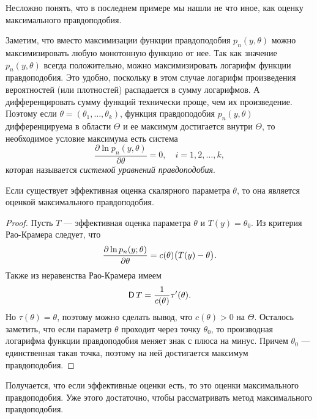 Несложно понять, что в последнем примере мы нашли не что иное, как оценку максимального правдоподобия.

Заметим, что вместо максимизации функции правдоподобия $p_n(y, \theta)$ можно максимизировать любую монотонную функцию от нее. Так как значение $p_n(y, \theta)$  всегда положительно, можно максимизировать логарифм функции правдоподобия. Это удобно, поскольку в этом случае логарифм произведения вероятностей (или плотностей) распадается в сумму логарифмов. А дифференцировать сумму функций технически проще, чем их произведение. Поэтому если $\theta = (\theta_1, \ldots, \theta_k)$, функция правдоподобия $p_n(y, \theta)$ дифференцируема в области $\Theta$ и ее максимум достигается внутри $\Theta$, то необходимое условие максимума есть система
    \[
        \dfrac{\partial\ln p_n(y, \theta)}{\partial \theta} = 0, \quad i = 1, 2, \ldots, k,
    \]
которая называется \emph{системой уравнений правдоподобия}.

\begin{point}
    Если существует эффективная оценка скалярного параметра $\theta$, то она является оценкой максимального правдоподобия.
\end{point}

\begin{proof}
    Пусть $T$ --- эффективная оценка параметра $\theta$ и $T(y) = \theta_0$. Из критерия Рао-Крамера следует, что
    \[
        \frac{\partial\ln p_n(y; \theta)}{\partial \theta} = c(\theta) \big( T(y) - \theta \big).
    \]
Также из неравенства Рао-Крамера имеем
    \[
        \D T = \frac{1}{c(\theta)} \tau'(\theta).
    \]
Но $\tau(\theta) = \theta$, поэтому можно сделать вывод, что $c(\theta) > 0$ на $\Theta$. Осталось заметить, что если параметр $\theta$ проходит через точку $\theta_0$, то производная логарифма функции правдоподобия меняет знак с плюса на минус. Причем $\theta_0$ --- единственная такая точка, поэтому на ней достигается максимум правдоподобия.
\end{proof}

Получается, что если эффективные оценки есть, то это оценки максимального правдоподобия. Уже этого достаточно, чтобы рассматривать метод максимального правдоподобия.
